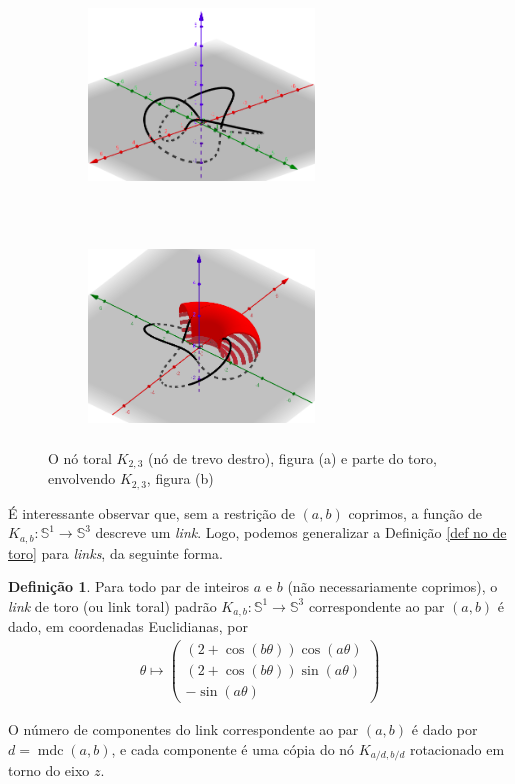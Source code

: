 \documentclass[a4paper,portuguese,11pt,twoside, leqno]{book}
\DeclareMathOperator{\mdc}{mdc}
\theoremstyle{definition}
\newtheorem{deff}{Definição}[section]
\begin{document}
	\begin{figure}[H]
		\centering
		\begin{subfigure}[t]{0.5\textwidth}
			\centering
			\includegraphics[width=6cm,height=5cm]{no_de_trevo_parametrizado.png}
			\caption{}
		\end{subfigure}%
		~ 
		\begin{subfigure}[t]{0.5\textwidth}
			\centering
			\includegraphics[width=6cm,height=5cm]{no_de_trevo_no_toro.png}
			\caption{}
		\end{subfigure}
		\caption{O nó toral $K_{2,3}$ (nó de trevo destro), figura (a) e parte do toro, envolvendo $K_{2,3}$, figura (b)}
	\end{figure}
	\par\vspace{0.3cm} É interessante observar que, sem a restrição de $(a,b)$ coprimos, a função de $K_{a,b}:\mathbb{S}^1\to\mathbb{S}^3$ descreve um \textit{link}. Logo, podemos generalizar a Definição \eqref{def no de toro} para \textit{links}, da seguinte forma.
	\begin{deff}
		\label{def link de toro}
		Para todo par de inteiros $a$ e $b$ (não necessariamente coprimos), o \textit{link} de toro (ou link toral) padrão $K_{a,b}: \mathbb{S}^1\to\mathbb{S}^3$ correspondente ao par $(a,b)$ é dado, em coordenadas Euclidianas, por 
		\begin{align*}
		\theta\mapsto
		\left( 
		\begin{matrix}
		(2+\cos(b\theta))\cos(a\theta) \\
		(2+\cos(b\theta))\sin(a\theta) \\
		-\sin(a\theta)
		\end{matrix} 
		\right)
		\end{align*}
		\par\vspace{0.3cm} O número de componentes do link correspondente ao par $(a,b)$ é dado por $d = \mdc(a,b)$, e cada componente é uma cópia do nó $\displaystyle{K_{a/d, b/d}}$ rotacionado em torno do eixo $z$.
	\end{deff}
\end{document}
